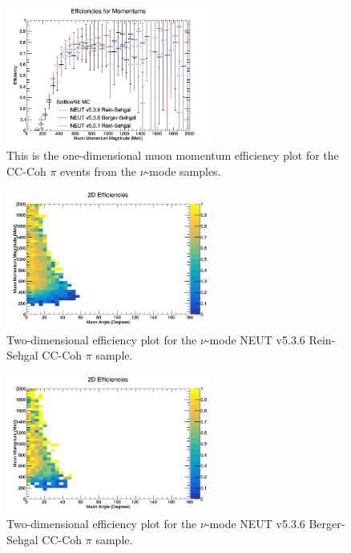 \documentclass[11pt]{article}
\begin{document}
\begin{figure}[H]
\centering
\includegraphics[width=0.6\textwidth]{NMCombinedPlotsImages/25-NMCombinedPlots.png}
\caption{This is the one-dimensional muon momentum efficiency plot for the CC-Coh $\pi$ events from the $\nu$-mode samples.}
\label{fig:app:NMCCCohMom1DEff}
\end{figure}

\begin{figure}[H]
\centering
\includegraphics[width=0.6\textwidth]{CCCohPlots/2DEffNMRS.png}
\caption{Two-dimensional efficiency plot for the $\nu$-mode NEUT v5.3.6 Rein-Sehgal CC-Coh $\pi$ sample.}
\label{fig:app:NMCCCohMuon2DEffRS}
\end{figure}

\begin{figure}[H]
\centering
\includegraphics[width=0.6\textwidth]{CCCohPlots/2DEffNMBS.png}
\caption{Two-dimensional efficiency plot for the $\nu$-mode NEUT v5.3.6 Berger-Sehgal CC-Coh $\pi$ sample.}
\label{fig:app:NMCCCohMuon2DEffBS}
\end{figure}
\end{document}
